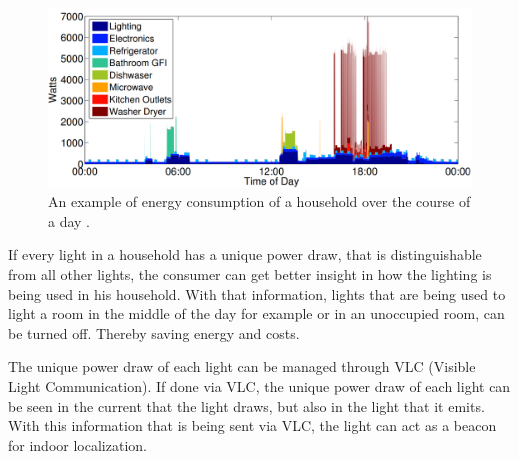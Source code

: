 \begin{figure}[t]
	\centering
	\includegraphics[width=\textwidth]{chapters/introduction-chapters/energy-consumption-house.png}
	\caption{An example of energy consumption of a household over the course of a day \cite{kolter2011redd}.}
	\label{fig:energy-consumption-house}
\end{figure}




If every light in a household has a unique power draw, that is distinguishable from all other lights, the consumer can get better insight in how the lighting is being used in his household. 
With that information, lights that are being used to light a room in the middle of the day for example or in an unoccupied room, can be turned off.
Thereby saving energy and costs.


The unique power draw of each light can be managed through VLC (Visible Light Communication).
If done via VLC, the unique power draw of each light can be seen in the current that the light draws, but also in the light that it emits.
With this information that is being sent via VLC, the light can act as a beacon for indoor localization.


















